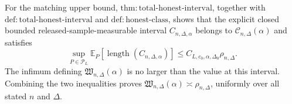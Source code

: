 For the matching upper bound, \(\mathrm{thm:total\text{-}honest\text{-}interval}\), together with \(\mathrm{def:total\text{-}honest\text{-}interval}\) and \(\mathrm{def:honest\text{-}class}\), shows that the explicit closed bounded released-sample-measurable interval \(C_{n,\Delta,\alpha}\) belongs to \(\mathcal C_{n,\Delta}(\alpha)\) and satisfies
\[
 \sup_{P\in\mathcal P_L}
 \mathbb E_P[\operatorname{length}(C_{n,\Delta,\alpha})]
 \leq C_{L,c_0,\alpha,\Delta_0}\rho_{n,\Delta}.
\]
The infimum defining \(\mathfrak W_{n,\Delta}(\alpha)\) is no larger than the value at this interval.  Combining the two inequalities proves \(\mathfrak W_{n,\Delta}(\alpha)\asymp\rho_{n,\Delta}\), uniformly over all stated \(n\) and \(\Delta\).
